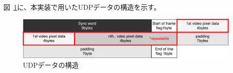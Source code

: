 %
%

図~\ref{fig:fpga-video-packet}に、本実装で用いたUDPデータの構造を示す。

\begin{figure}[htbp]
  \begin{center}
    \includegraphics[bb=0 0 643 122,width=15.5cm]{img/fpga-video-packet.pdf}
  \end{center}
  \caption{UDPデータの構造}
  \label{fig:fpga-video-packet}
\end{figure}

